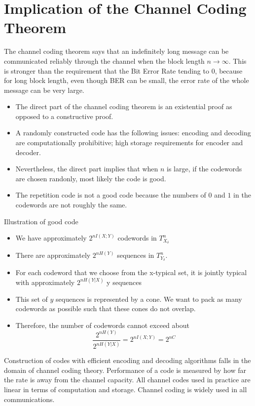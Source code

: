 \documentclass[../main.tex]{subfiles}
\begin{document}
 \section{Implication of the Channel Coding Theorem}
 The channel coding theorem says that an indefinitely long message can be communicated reliably through the channel when the block length $n\to \infty$. This is stronger than the requirement that the Bit Error Rate tending to $0$, because for long block length, even though BER can be small, the error rate of the whole message can be very large.
 \begin{itemize}
     \item The direct part of the channel coding theorem is an existential proof as opposed to a constructive proof.
     \item A randomly constructed code has the following issues: encoding and decoding are computationally prohibitive; high storage requirements for encoder and decoder.
     \item Nevertheless, the direct part implies that when $n$ is large, if the codewords are chosen randonly, most likely the code is good.
     \item The repetition code is not a good code because the numbers of $0$ and $1$ in the codewords are not roughly the same.
 \end{itemize}
 \begin{pbox}{Illustration of good code}
     \begin{itemize}
         \item We have approximately $2^{nI(X;Y)}$ codewords in $T^n_{X_\delta}$ 
         \item There are approximately $2^{nH(Y)}$ sequences in $T^n_{Y_\delta}$. 
         \item For each codeword that we choose from the x-typical set, it is jointly typical with approximately $2^{nH(Y|X)}$ y sequences 
         \item This set of $y$ sequences is represented by a cone. We want to pack as many codewords as possible such that these cones do not overlap.
         \item Therefore, the number of codewords cannot exceed about \[
         \frac{2^{nH(Y)}}{2^{nH(Y|X)}}=2^{nI(X;Y)}=2^{nC}
         \]
     \end{itemize}
 \end{pbox}
 Construction of codes with efficient encoding and decoding algorithms falls in the domain of channel coding theory. Performance of a code is measured by how far the rate is away from the channel capacity. All channel codes used in practice are linear in terms of computation and storage. Channel coding is widely used in all communications.
\end{document}

